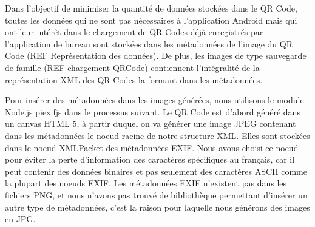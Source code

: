 \par
Dans l'objectif de minimiser la quantité de données stockées dans le QR Code, toutes les données qui ne sont pas nécessaires à l'application Android mais qui ont leur intérêt dans le chargement de QR Codes déjà enregistrés par l'application de bureau sont stockées dans les métadonnées de l'image du QR Code (REF Représentation des données). De plus, les images de type sauvegarde de famille (REF chargement QRCode) contiennent l'intégralité de la représentation XML des QR Codes la formant dans les métadonnées.\\
\par
Pour insérer des métadonnées dans les images générées, nous utilisons le module Node.js piexifjs dans le processus suivant. Le QR Code est d'abord généré dans un canvas HTML 5, à partir duquel on va générer une image JPEG contenant dans les métadonnées le noeud racine de notre structure XML. Elles sont stockées dans le noeud XMLPacket des métadonnées EXIF. Nous avons choisi ce noeud pour éviter la perte d'information des caractères spécifiques au français, car il peut contenir des données binaires et pas seulement des caractères ASCII comme la plupart des noeuds EXIF. Les métadonnées EXIF n'existent pas dans les fichiers PNG, et nous n'avons pas trouvé de bibliothèque permettant d'insérer un autre type de métadonnées, c'est la raison pour laquelle nous générons des images en JPG.